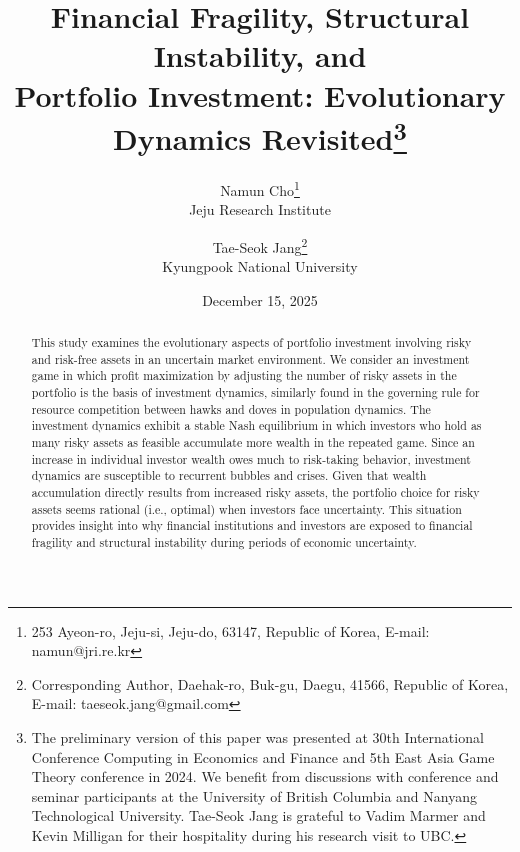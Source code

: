 \documentclass[11pt,a4paper]{article}
\begin{document}
\title{\vspace{-6ex}
{Financial Fragility, Structural Instability, and \\[-1ex] Portfolio Investment: \Large Evolutionary Dynamics Revisited}\thanks{The preliminary version of this paper was presented at 30th International Conference Computing in Economics and Finance and 5th East Asia Game Theory conference in 2024. We benefit from discussions with conference and seminar participants at the University of British Columbia and Nanyang Technological University. Tae-Seok Jang is grateful to Vadim Marmer and Kevin Milligan for their hospitality during his research visit to UBC.}
}

\author{
Namun Cho\thanks{253 Ayeon-ro, Jeju-si, Jeju-do, 63147, Republic of Korea, E-mail: namun@jri.re.kr} \\[-3ex] Jeju Research Institute \and Tae-Seok Jang\thanks{Corresponding Author, Daehak-ro, Buk-gu, Daegu, 41566, Republic of Korea, E-mail: taeseok.jang@gmail.com}\\[-3ex] Kyungpook National University 
}

\date{\smallskip December 15, 2025}


\maketitle
\begin{abstract}
\noindent
This study examines the evolutionary aspects of portfolio investment involving risky and risk-free assets in an uncertain market environment. We consider an investment game in which profit maximization by adjusting the number of risky assets in the portfolio is the basis of investment dynamics, similarly found in the governing rule for resource competition between hawks and doves in population dynamics. The investment dynamics exhibit a stable Nash equilibrium in which investors who hold as many risky assets as feasible accumulate more wealth in the repeated game. Since an increase in individual investor wealth owes much to risk-taking behavior, investment dynamics are susceptible to recurrent bubbles and crises. Given that wealth accumulation directly results from increased risky assets, the portfolio choice for risky assets seems rational (i.e., optimal) when investors face uncertainty. This situation provides insight into why financial institutions and investors are exposed to financial fragility and structural instability during periods of economic uncertainty. 
\end{abstract}
\end{document}
